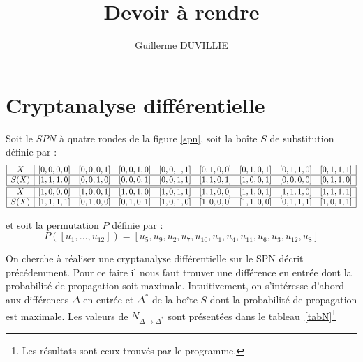 \documentclass[a4paper,11pt]{article}
\author{}
\title{}
\title{Devoir à rendre}
\author{Guillerme DUVILLIE}
\begin{document}
\maketitle

\section*{Cryptanalyse différentielle}

Soit le $SPN$ à quatre rondes de la figure \ref{spn}, soit la boîte $S$ de substitution définie par
:
\begin{displaymath}
    \begin{array}{|c|cccccccc|} \hline
        X & [0,0,0,0] & [0,0,0,1] & [0,0,1,0] & [0,0,1,1] & [0,1,0,0] & [0,1,0,1] & [0,1,1,0] &
        [0,1,1,1] \\ \hline
        S(X) & [1,1,1,0] & [0,0,1,0] & [0,0,0,1] & [0,0,1,1] & [1,1,0,1] & [1,0,0,1] & [0,0,0,0] &
        [0,1,1,0] \\ \hline \hline
        X & [1,0,0,0] & [1,0,0,1] & [1,0,1,0] & [1,0,1,1] & [1,1,0,0] & [1,1,0,1] & [1,1,1,0] &
        [1,1,1,1] \\ \hline
        S(X) & [1,1,1,1] & [0,1,0,0] & [0,1,0,1] & [1,0,1,0] & [1,0,0,0] & [1,1,0,0] & [0,1,1,1] &
        [1,0,1,1] \\ \hline
    \end{array}
\end{displaymath}

et soit la permutation $P$ définie par : 
\begin{displaymath}
    P([u_1,\dots,u_{12}]) = [u_5, u_9, u_2, u_7, u_{10}, u_1, u_4, u_{11}, u_6, u_3, u_{12}, u_8]
\end{displaymath}

On cherche à réaliser une cryptanalyse différentielle sur le SPN décrit précédemment. Pour ce faire
il nous faut trouver une différence en entrée dont la probabilité de propagation soit maximale.
Intuitivement, on s'intéresse d'abord aux différences $\Delta$ en entrée et $\Delta^*$ de la boîte
$S$ dont la probabilité de propagation est maximale. Les valeurs de $N_{\Delta \rightarrow
\Delta^*}$ sont présentées dans le tableau~\ref{tabN}\footnote{Les résultats sont ceux trouvés par
le programme.}
\end{document}
